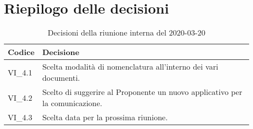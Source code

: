 \section{Riepilogo delle decisioni}
\begin{longtable}{ 
	 >{\centering}p{} >{}p{} }
	
	\caption{Decisioni della riunione interna del 2020-03-20}\\	
	
	\textbf{\color{white}Codice} & 
	\textbf{\color{white}Decisione} 
	\tabularnewline  
	\endhead
	
	VI\_4.1 & Scelta modalità di nomenclatura all'interno dei vari documenti. \\
	VI\_4.2 & Scelto di suggerire al Proponente\ped{\textit{G}} un nuovo applicativo per la comunicazione. \\
	VI\_4.3 & Scelta data per la prossima riunione. \\
	
\end{longtable}